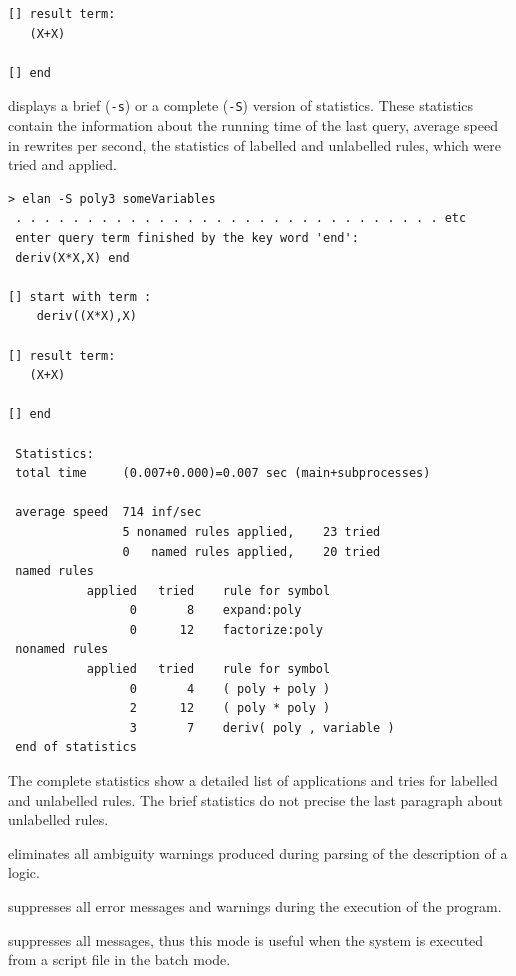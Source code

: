 \begin{description}
{\begin{verbatim}
[] result term:
   (X+X)

[] end
\end{verbatim} }

 \item[{\tt -s} ({\tt -S}, or {\tt --statistics})]
   displays
   a brief ({\tt -s}) or a complete ({\tt -S}) version of statistics. These
   statistics contain the information about the running time
   of the last query, average speed in rewrites per second,
   the statistics of labelled and unlabelled rules, which were tried and applied.
{\footnotesize\begin{verbatim}
> elan -S poly3 someVariables
 . . . . . . . . . . . . . . . . . . . . . . . . . . . . . . etc
 enter query term finished by the key word 'end':
 deriv(X*X,X) end

[] start with term :
    deriv((X*X),X)

[] result term:
   (X+X)

[] end

 Statistics:
 total time     (0.007+0.000)=0.007 sec (main+subprocesses)

 average speed  714 inf/sec
                5 nonamed rules applied,    23 tried
                0   named rules applied,    20 tried
 named rules
           applied   tried    rule for symbol
                 0       8    expand:poly
                 0      12    factorize:poly
 nonamed rules
           applied   tried    rule for symbol
                 0       4    ( poly + poly )
                 2      12    ( poly * poly )
                 3       7    deriv( poly , variable )
 end of statistics
\end{verbatim} } 
%
The complete statistics show a detailed list of
applications and tries for labelled and unlabelled rules.
The brief statistics do not precise the last paragraph about 
unlabelled rules.

 \item[{\tt -w} (or, {\tt --warningsoff})]
   eliminates all ambiguity warnings
   produced during parsing of the \elan{} description of a logic.

 \item[{\tt -q} (or, {\tt --quiet})]
   suppresses all error messages and warnings during the
   execution of the \elan{} program.

 \item[{\tt -b} (or, {\tt --batch})]
   suppresses all messages, thus this mode
   is useful when the \elan{} system is 
   executed from a script file in the batch mode.


\end{description}
